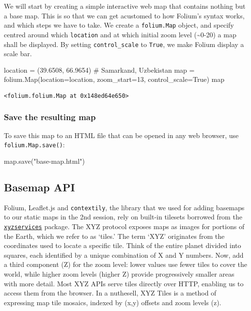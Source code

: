 \documentclass[
  letterpaper,
  DIV=11,
  numbers=noendperiod]{scrreprt}
\newenvironment{Shaded}{\begin{snugshade}}{\end{snugshade}}
\newcommand{\BuiltInTok}[1]{\textcolor[rgb]{0.00,0.23,0.31}{#1}}
\newcommand{\CommentTok}[1]{\textcolor[rgb]{0.37,0.37,0.37}{#1}}
\newcommand{\DecValTok}[1]{\textcolor[rgb]{0.68,0.00,0.00}{#1}}
\newcommand{\FloatTok}[1]{\textcolor[rgb]{0.68,0.00,0.00}{#1}}
\newcommand{\NormalTok}[1]{\textcolor[rgb]{0.00,0.23,0.31}{#1}}
\newcommand{\OperatorTok}[1]{\textcolor[rgb]{0.37,0.37,0.37}{#1}}
\newcommand{\StringTok}[1]{\textcolor[rgb]{0.13,0.47,0.30}{#1}}
\newcommand{\VariableTok}[1]{\textcolor[rgb]{0.07,0.07,0.07}{#1}}
\begin{document}
We will start by creating a simple interactive web map that contains
nothing but a base map. This is so that we can get acustomed to how
Folium's syntax works, and which steps we have to take. We create a
\texttt{folium.Map} object, and specify centred around which
\texttt{location} and at which initial zoom level (\textasciitilde0-20)
a map shall be displayed. By setting \texttt{control\_scale} to
\texttt{True}, we make Folium display a scale bar.

\begin{Shaded}
\begin{Highlighting}[]
\NormalTok{location }\OperatorTok{=}\NormalTok{ (}\FloatTok{39.6508}\NormalTok{, }\FloatTok{66.9654}\NormalTok{) }\CommentTok{\# Samarkand, Uzbekistan}
\BuiltInTok{map} \OperatorTok{=}\NormalTok{ folium.Map(location}\OperatorTok{=}\NormalTok{location, zoom\_start}\OperatorTok{=}\DecValTok{13}\NormalTok{, control\_scale}\OperatorTok{=}\VariableTok{True}\NormalTok{)}
\BuiltInTok{map}
\end{Highlighting}
\end{Shaded}

\begin{verbatim}
<folium.folium.Map at 0x148ed64e650>
\end{verbatim}

\subsubsection{Save the resulting map}\label{save-the-resulting-map}

To save this map to an HTML file that can be opened in any web browser,
use \texttt{folium.Map.save()}:

\begin{Shaded}
\begin{Highlighting}[]
\BuiltInTok{map}\NormalTok{.save(}\StringTok{"base{-}map.html"}\NormalTok{)}
\end{Highlighting}
\end{Shaded}

\subsection{Basemap API}\label{basemap-api}

Folium, Leaflet.js and \texttt{contextily}, the library that we used for
adding basemaps to our static maps in the 2nd session, rely on built-in
tilesets borrowed from the
\href{https://github.com/geopandas/xyzservices}{\texttt{xyzservices}}
package. The XYZ protocol exposes maps as images for portions of the
Earth, which we refer to as `tiles.' The term `XYZ' originates from the
coordinates used to locate a specific tile. Think of the entire planet
divided into squares, each identified by a unique combination of X and Y
numbers. Now, add a third component (Z) for the zoom level: lower values
use fewer tiles to cover the world, while higher zoom levels (higher Z)
provide progressively smaller areas with more detail. Most XYZ APIs
serve tiles directly over HTTP, enabling us to access them from the
browser. In a nuthesell, XYZ Tiles is a method of expressing map tile
mosaics, indexed by (x,y) offsets and zoom levels (z).
\end{document}
